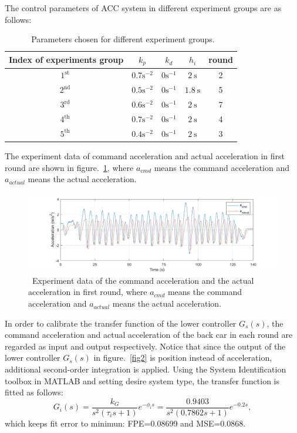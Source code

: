 \documentclass[a4paper,fleqn]{cas-sc}
\begin{document}
The control parameters of ACC system in different experiment groups are as follows:
\begin{table}
  \caption{~Parameters chosen for different experiment groups.}
  \begin{tabular}{ccccc}
    \hline Index of experiments group & $k_{p}$               & $k_{d}$              & $h_{i}$           & round \\
    \hline $1^{\text {st }}$          & $0.7 \mathrm{s}^{-2}$ & $0  \mathrm{s}^{-1}$ & $2 \mathrm{~s}$   & 2     \\
    \hline $2^{\text {nd }}$          & $0.5 \mathrm{s}^{-2}$ & $0  \mathrm{s}^{-1}$ & $1.8 \mathrm{~s}$ & 5     \\
    \hline $3^{\text {rd }}$          & $0.6 \mathrm{s}^{-2}$ & $0  \mathrm{s}^{-1}$ & $2 \mathrm{~s}$   & 7     \\
    \hline $4^{\text {th }}$          & $0.7 \mathrm{s}^{-2}$ & $0  \mathrm{s}^{-1}$ & $2 \mathrm{~s}$   & 4     \\
    \hline $5^{\text {th }}$          & $0.4 \mathrm{s}^{-2}$ & $0  \mathrm{s}^{-1}$ & $2 \mathrm{~s}$   & 3     \\
    \hline
  \end{tabular}
  \label{table 2}
\end{table}

The experiment data of command acceleration and actual acceleration in first round are shown in figure.~\ref{fig14}, where $a_{cmd}$ means the command acceleration and $a_{actual}$ means the actual acceleration.

\begin{figure}
  \centering
  \includegraphics[width=14cm]{figs/fig14.png}
  \caption{~Experiment data of the command acceleration and the actual acceleration in first round, where $a_{cmd}$ means the command acceleration and $a_{actual}$ means the actual acceleration.}
  \label{fig14}
\end{figure}

In order to calibrate the transfer function of the lower controller $G_s (s)$, the command acceleration and actual acceleration of the back car in each round are regarded as input and output respectively. Notice that since the output of the lower controller $G_s (s)$ in figure.~\ref{fig2} is position instead of acceleration, additional second-order integration is applied. Using the System Identification toolbox in MATLAB and setting desire system type, the transfer function is fitted as follows:
\begin{equation}
  G_{i}(s)=\frac{k_{G}}{s^{2}\left(\tau_{i} s+1\right)} e^{-\phi_{i} s}=\frac{0.9403}{s^{2}(0.7862 s+1)} e^{-0.2 s},
\end{equation}
which keeps fit error to minimun: FPE=0.08699 and MSE=0.0868.
\end{document}
